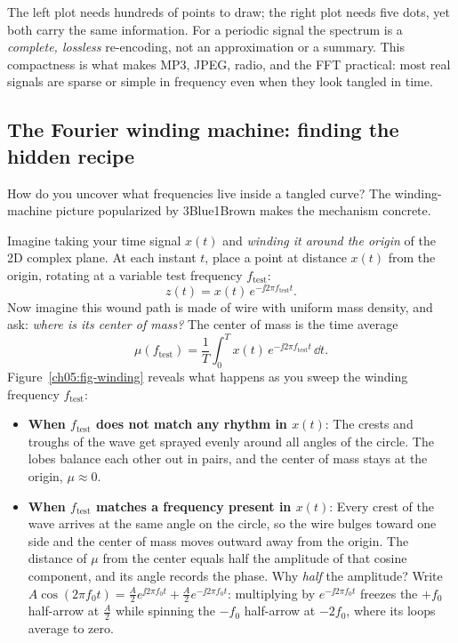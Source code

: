 \begin{aestheticbox}
The left plot needs hundreds of points to draw; the right plot
needs five dots, yet both carry the same information. For a periodic signal the spectrum is a
\emph{complete, lossless} re-encoding, not an approximation or a summary. This
compactness is what makes MP3, JPEG, radio, and the FFT practical: most real signals
are sparse or simple in frequency even when they look tangled in time.
\end{aestheticbox}

\subsection{The Fourier winding machine: finding the hidden recipe}
\label{ch05:winding}

How do you uncover what frequencies live inside a tangled curve? The
winding-machine picture popularized by 3Blue1Brown makes the mechanism concrete.

Imagine taking your time signal $x(t)$ and \emph{winding it around the origin} of the 2D complex plane.
At each instant $t$, place a point at distance $x(t)$ from the origin, rotating at a variable test
frequency $f_{\text{test}}$:
\[
  z(t) = x(t)\,e^{-\jj 2\pi f_{\text{test}} t} .
\]
Now imagine this wound path is made of wire with uniform mass density, and ask: \emph{where is its center of mass?}
The center of mass is the time average
\[
  \mu(f_{\text{test}}) = \frac{1}{T}\int_0^T x(t)\,e^{-\jj 2\pi f_{\text{test}} t}\,\dd t .
\]
Figure~\ref{ch05:fig-winding} reveals what happens as you sweep the winding frequency $f_{\text{test}}$:

\begin{itemize}
  \item \textbf{When $f_{\text{test}}$ does not match any rhythm in $x(t)$}: The crests and troughs of the
  wave get sprayed evenly around all angles of the circle. The lobes balance each other out in pairs, and the
  center of mass stays at the origin, $\mu \approx 0$.
  \item \textbf{When $f_{\text{test}}$ matches a frequency present in $x(t)$}: Every crest of the wave arrives
  at the same angle on the circle, so the wire bulges toward one side and the center of mass moves outward
  away from the origin. The distance of $\mu$ from the center equals half the amplitude of that cosine component,
  and its angle records the phase. Why \emph{half} the amplitude? Write $A\cos(2\pi f_0 t) = \tfrac{A}{2}e^{\jj 2\pi f_0 t} + \tfrac{A}{2}e^{-\jj 2\pi f_0 t}$: multiplying by $e^{-\jj 2\pi f_0 t}$ freezes the $+f_0$ half-arrow at $\tfrac{A}{2}$ while spinning the $-f_0$ half-arrow at $-2f_0$, where its loops average to zero.
\end{itemize}

